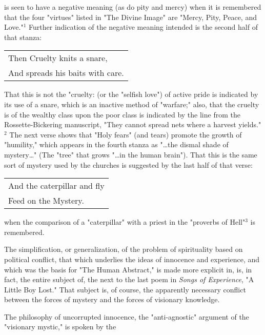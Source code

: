 \noindent is seen to have a negative meaning (as do pity and mercy) when it is remembered that the four "virtues" listed in 
"The Divine Image" are "Mercy, Pity, Peace, and Love."$^{1}$ Further indication of the negative meaning intended is the second half of that stanza:\par
\begin{center}
	\begin{tabular}{l}
		Then Cruelty knits a snare, \\
		And spreads his baits with care.
	\end{tabular}
\end{center}
\hspace*{5mm}That this is not the "cruelty: (or the "selfish love") of active pride is indicated by its use of a snare, which is an
inactive method of "warfare;" also, that the cruelty is of the wealthy class upon the poor class is indicated by the line from
the Rossette-Bickering manuscript, "They cannot spread nets where a harvest yields."$^{2}$ The next verse shows that "Holy fears" (and tears) promote
the growth of "humility," which appears in the fourth stanza as "\dots the dismal shade of mystery\dots" (The "tree" that grows "\dots in the human brain").
That this is the same sort of mystery used by the churches is suggested by the last half of that verse:\par
\begin{center}
	\begin{tabular}{l}
		And the caterpillar and fly \\
		Feed on the Mystery.
	\end{tabular}
\end{center}
when the comparison of a "caterpillar" with a priest in the "proverbs of Hell"$^{3}$ is remembered.\par
\vspace*{0.5\baselineskip}
The simplification, or generalization, of the problem of spirituality based on political conflict, that which underlies
the ideas of innocence and experience, and which was the basis for "The Human Abstract," is made more explicit in, is, in fact,
the entire subject of, the next to the last poem in \textit{Songs of Experience}, "A Little Boy Lost." That subject is, of course,
the apparently necessary conflict between the forces of mystery and the forces of visionary knowledge.\par
\vspace*{0.5\baselineskip}
The philosophy of uncorrupted innocence, the "anti-agnostic" argument of the "visionary mystic," is spoken by the 
